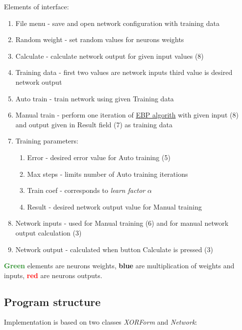 Elements of interface:
\begin{enumerate}[topsep=8pt,itemsep=-1ex,partopsep=1ex,parsep=1ex]
    \item \label{FileMenu} File menu - save and open network configuration with training data
    \item \label{RandomWeight} Random weight - set random values for neurons weights
    \item Calculate - calculate network output for given input values (8)
    \item \label{TrainingData} Training data - first two values are network inputs third value is desired network output
    \item \label{AutoTrain} Auto train - train network using given Training data
    \item Manual train - perform one iteration of \hyperref[formula:EBP]{EBP algorith} with given input (8) and output given in Result field (7) as training data
    \item Training parameters:
    \begin{enumerate}[topsep=-1ex,itemsep=-1ex,partopsep=1ex,parsep=1ex]
        \item \label{Error} Error - desired error value for Auto training (5)
        \item \label{MaxSteps} Max steps - limits number of Auto training iterations
        \item \label{TrainCoef} Train coef - corresponds to \textit{learn factor} $\alpha$
        \item Result - desired network output value for Manual training
    \end{enumerate}
    \item Network inputs - used for Manual training (6) and for manual network output calculation (3)
    \item Network output - calculated when button Calculate is pressed (3)
\end{enumerate}

\textcolor{ForestGreen}{\textbf{Green}} elements are neurons weights, \textcolor{Cerulean}{\textbf{blue}} are multiplication of weights and inputs, \textcolor{red}{\textbf{red}} are neurons outputs.

\subsection{Program structure}
\label{ProgramStrucutre}

Implementation is based on two classes \textit{XORForm} and \textit{Network}:

